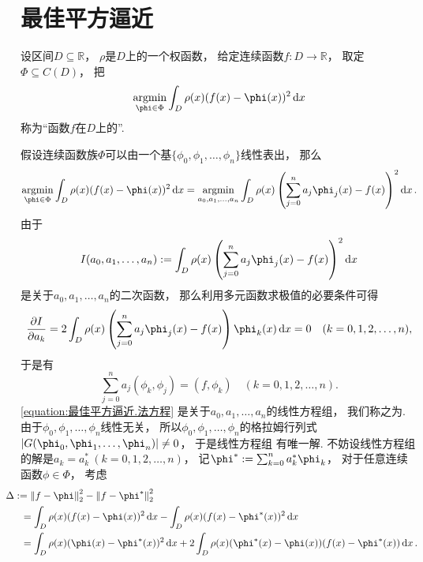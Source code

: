 \section{最佳平方逼近}
\begin{definition}
设区间\(D \subseteq \mathbb{R}\)，
\(\rho\)是\(D\)上的一个权函数，
给定连续函数\(f\colon D \to \mathbb{R}\)，
取定\(\Phi \subseteq C(D)\)，
把\begin{equation*}
	\argmin_{\phi \in \Phi} \int_D \rho(x) (f(x) - \phi(x))^2 \dd{x}
\end{equation*}
称为“函数\(f\)在\(D\)上的”.
\end{definition}

假设连续函数族\(\Phi\)可以由一个基\(\{\phi_0,\phi_1,\dotsc,\phi_n\}\)线性表出，
那么\begin{equation*}
	\argmin_{\phi \in \Phi} \int_D \rho(x) (f(x) - \phi(x))^2 \dd{x}
	= \argmin_{a_0,a_1,\dotsc,a_n} \int_D \rho(x) \left( \sum_{j=0}^n a_j \phi_j(x) - f(x) \right)^2 \dd{x}.
\end{equation*}
由于\begin{equation*}
	I(a_0,a_1,\dotsc,a_n)
	\defeq
	\int_D \rho(x) \left( \sum_{j=0}^n a_j \phi_j(x) - f(x) \right)^2 \dd{x}
\end{equation*}
是关于\(a_0,a_1,\dotsc,a_n\)的二次函数，
那么利用多元函数求极值的必要条件可得\begin{equation*}
	\pdv{I}{a_k}
	= 2 \int_D \rho(x) \left( \sum_{j=0}^n a_j \phi_j(x) - f(x) \right) \phi_k(x) \dd{x}
	= 0
	\quad(k=0,1,2,\dotsc,n),
\end{equation*}
于是有\begin{equation}\label{equation:最佳平方逼近.法方程}
	\sum_{j=0}^n a_j (\phi_k,\phi_j)
	= (f,\phi_k)
	\quad(k=0,1,2,\dotsc,n).
\end{equation}
\cref{equation:最佳平方逼近.法方程}
是关于\(a_0,a_1,\dotsc,a_n\)的线性方程组，
我们称之为.
由于\(\phi_0,\phi_1,\dotsc,\phi_n\)线性无关，
所以\(\phi_0,\phi_1,\dotsc,\phi_n\)的格拉姆行列式
\(\DeterminantA{G(\phi_0,\phi_1,\dotsc,\phi_n)} \neq 0\)，
于是线性方程组  有唯一解.
不妨设线性方程组  的解是\(a_k = a^*_k\ (k=0,1,2,\dotsc,n)\)，
记\(
	\phi^*
	\defeq \sum_{k=0}^n a^*_k \phi_k
\)，
对于任意连续函数\(\phi \in \Phi\)，
考虑\begin{align*}
	&\hspace{-15pt}
	\Delta
	\defeq
	\norm{f - \phi}_2^2 - \norm{f - \phi^*}_2^2 \\
	&= \int_D \rho(x) (f(x) - \phi(x))^2 \dd{x}
		- \int_D \rho(x) (f(x) - \phi^*(x))^2 \dd{x} \\
	&= \int_D \rho(x) (\phi(x) - \phi^*(x))^2 \dd{x}
		+ 2 \int_D \rho(x) (\phi^*(x) - \phi(x)) (f(x) - \phi^*(x)) \dd{x}.
\end{align*}
